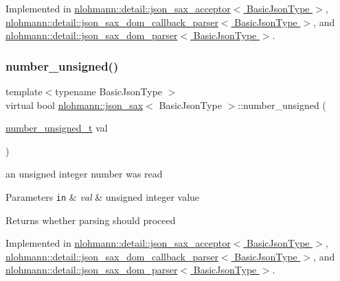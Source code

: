 Implemented in \hyperlink{classnlohmann_1_1detail_1_1json__sax__acceptor_ab74d476d1540851afc690aff28301cac}{nlohmann\+::detail\+::json\+\_\+sax\+\_\+acceptor$<$ Basic\+Json\+Type $>$}, \hyperlink{classnlohmann_1_1detail_1_1json__sax__dom__callback__parser_ad9a642701515c3cd85e6d72f9fa117c9}{nlohmann\+::detail\+::json\+\_\+sax\+\_\+dom\+\_\+callback\+\_\+parser$<$ Basic\+Json\+Type $>$}, and \hyperlink{classnlohmann_1_1detail_1_1json__sax__dom__parser_a835f34811b941c9d9d90b8960b50ed36}{nlohmann\+::detail\+::json\+\_\+sax\+\_\+dom\+\_\+parser$<$ Basic\+Json\+Type $>$}.

\mbox{\label{structnlohmann_1_1json__sax_ad9b253083e0509923ba195136f49face}} 
\subsubsection{\texorpdfstring{number\+\_\+unsigned()}{number\_unsigned()}}
{\footnotesize\ttfamily template$<$typename Basic\+Json\+Type $>$ \\
virtual bool \hyperlink{structnlohmann_1_1json__sax}{nlohmann\+::json\+\_\+sax}$<$ Basic\+Json\+Type $>$\+::number\+\_\+unsigned (\begin{DoxyParamCaption}\item[{\hyperlink{structnlohmann_1_1json__sax_a32028cc056ae0f43aaae331cdbbbf856}{number\+\_\+unsigned\+\_\+t}}]{val }\end{DoxyParamCaption})\hspace{0.3cm}{\ttfamily [pure virtual]}}



an unsigned integer number was read 


\begin{DoxyParams}[1]{Parameters}
\mbox{\tt in}  & {\em val} & unsigned integer value \\
\hline
\end{DoxyParams}
\begin{DoxyReturn}{Returns}
whether parsing should proceed 
\end{DoxyReturn}


Implemented in \hyperlink{classnlohmann_1_1detail_1_1json__sax__acceptor_a0759eb1ea812c4cfdf42065dd7f4c71b}{nlohmann\+::detail\+::json\+\_\+sax\+\_\+acceptor$<$ Basic\+Json\+Type $>$}, \hyperlink{classnlohmann_1_1detail_1_1json__sax__dom__callback__parser_abdbdf0d6cd07a997217ce74df8a42493}{nlohmann\+::detail\+::json\+\_\+sax\+\_\+dom\+\_\+callback\+\_\+parser$<$ Basic\+Json\+Type $>$}, and \hyperlink{classnlohmann_1_1detail_1_1json__sax__dom__parser_a5140b219d7e4c291ca24d7d736798062}{nlohmann\+::detail\+::json\+\_\+sax\+\_\+dom\+\_\+parser$<$ Basic\+Json\+Type $>$}.

